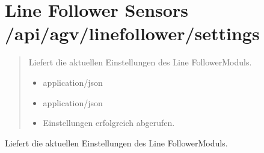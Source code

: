 \documentclass[letterpaper,10pt,english]{sphinxmanual}
\begin{document}
\section{Line Follower Sensors \textendash{} /api/agv/linefollower/settings}
\label{\detokenize{agv_rest_api_linefollower:line-follower-sensors-api-agv-linefollower-settings}}\label{\detokenize{agv_rest_api_linefollower:get-api-agv-line-follower-settings}}

\begin{fulllineitems}
\label{\detokenize{agv_rest_api_linefollower:get--api-agv-linefollower-settings}}
\pysigstartsignatures
\pysigline
{}
\pysigstopsignatures\begin{quote}\begin{description}
\sphinxAtStartPar
Liefert die aktuellen Einstellungen des Line Follower\sphinxhyphen{}Moduls.

\begin{itemize}
\item {} 
\sphinxAtStartPar
{} \textendash{} application/json

\end{itemize}

\begin{itemize}
\item {} 
\sphinxAtStartPar
{} \textendash{} application/json

\end{itemize}

\begin{itemize}
\item {} 
\sphinxAtStartPar
{} \textendash{} Einstellungen erfolgreich abgerufen.

\end{itemize}

\end{description}\end{quote}

\end{fulllineitems}


\sphinxAtStartPar
{}
Liefert die aktuellen Einstellungen des Line Follower\sphinxhyphen{}Moduls.
\end{document}

